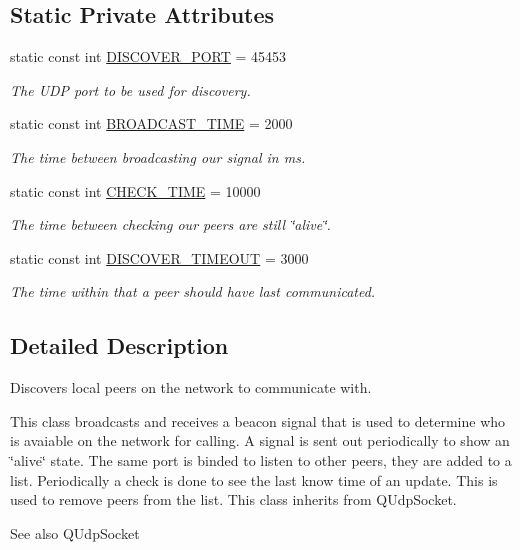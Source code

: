 \subsection*{\-Static \-Private \-Attributes}
\begin{DoxyCompactItemize}
\item 
static const int \hyperlink{class_network_discover_aae5acabb49790c03dd076c235fd3014c}{\-D\-I\-S\-C\-O\-V\-E\-R\-\_\-\-P\-O\-R\-T} = 45453
\begin{DoxyCompactList}\small\item\em \-The \-U\-D\-P port to be used for discovery. \end{DoxyCompactList}\item 
static const int \hyperlink{class_network_discover_ac85620fa17d1128dc86745611df1dbe0}{\-B\-R\-O\-A\-D\-C\-A\-S\-T\-\_\-\-T\-I\-M\-E} = 2000
\begin{DoxyCompactList}\small\item\em \-The time between broadcasting our signal in ms. \end{DoxyCompactList}\item 
static const int \hyperlink{class_network_discover_afc4903f686b81fff1247fc7cbcea17ff}{\-C\-H\-E\-C\-K\-\_\-\-T\-I\-M\-E} = 10000
\begin{DoxyCompactList}\small\item\em \-The time between checking our peers are still \char`\"{}alive\char`\"{}. \end{DoxyCompactList}\item 
static const int \hyperlink{class_network_discover_aebe784b2c4a47256321246c7d4fca5e6}{\-D\-I\-S\-C\-O\-V\-E\-R\-\_\-\-T\-I\-M\-E\-O\-U\-T} = 3000
\begin{DoxyCompactList}\small\item\em \-The time within that a peer should have last communicated. \end{DoxyCompactList}\end{DoxyCompactItemize}


\subsection{\-Detailed \-Description}
\-Discovers local peers on the network to communicate with. 

\-This class broadcasts and receives a beacon signal that is used to determine who is avaiable on the network for calling. \-A signal is sent out periodically to show an \char`\"{}alive\char`\"{} state. \-The same port is binded to listen to other peers, they are added to a list. \-Periodically a check is done to see the last know time of an update. \-This is used to remove peers from the list. \-This class inherits from \-Q\-Udp\-Socket. \begin{DoxySeeAlso}{\-See also}
\-Q\-Udp\-Socket 
\end{DoxySeeAlso}


